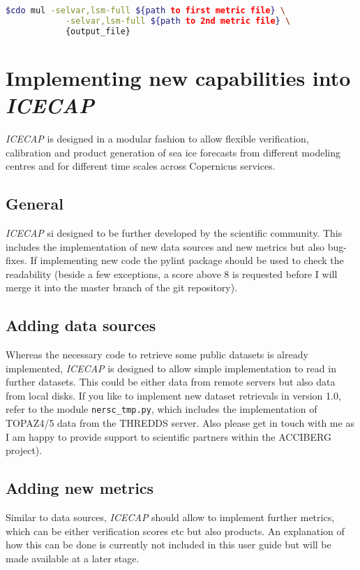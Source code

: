 \documentclass[DIV=10, parskip=full]{scrreprt}
\newcommand{\ice}{\textit{ICECAP}\xspace}
\newcommand{\version}{1.0\xspace}
\newcommand{\notimplement}[1]{#1}
\begin{document}
\begin{lstlisting}[language=bash, float]
	$cdo mul -selvar,lsm-full ${path to first metric file} \
			-selvar,lsm-full ${path to 2nd metric file} \
			{output_file}
\end{lstlisting}


\chapter{Implementing new capabilities into  \ice}\label{chap:develop}
\ice is designed in a modular fashion to allow flexible verification, calibration and product generation of sea ice forecasts from different modeling centres and for different time scales across Copernicus services. 

\section{General}
\ice si designed to be further developed by the scientific community. This includes the implementation of new data sources and new metrics but also bug-fixes. If implementing new code the pylint package should be used to check the readability (beside a few exceptions, a score above 8 is requested before I will merge it into the master branch of the git repository).

\section{Adding data sources}
Whereas the necessary code to retrieve some public datasets is already implemented, \ice is designed to allow simple implementation to read in further datasets. This could be either data from remote servers but also data from local disks. \notimplement{If you like to implement new dataset retrievals in version \version, refer to the module \texttt{nersc\_tmp.py}, which includes the implementation of TOPAZ4/5 data from the THREDDS server. Also please get in touch with me as I am happy to provide support to scientific partners within the ACCIBERG project).}

\section{Adding new metrics}
Similar to data sources, \ice should allow to implement further metrics, which can be either verification scores etc but also products. An explanation of how this can be done is currently \notimplement{not included in this user guide but will be made available at a later stage}. \\
\end{document}
